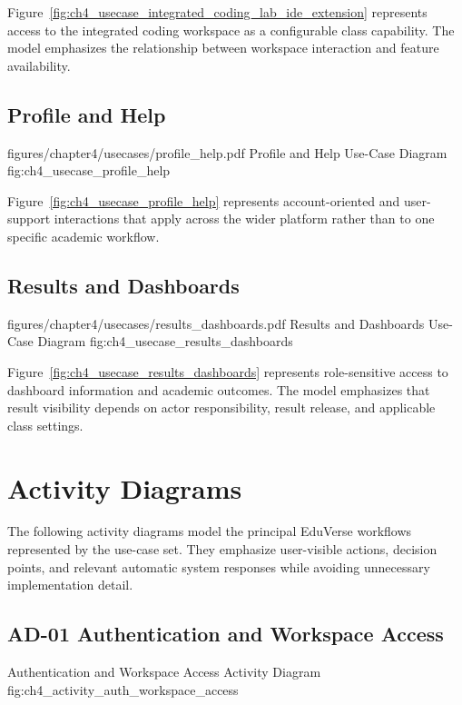 Figure~\ref{fig:ch4_usecase_integrated_coding_lab_ide_extension} represents
access to the integrated coding workspace as a configurable class capability.
The model emphasizes the relationship between workspace interaction and
feature availability.

\subsection*{Profile and Help}

\EduUseCasePdfFigure
  {figures/chapter4/usecases/profile_help.pdf}
  {Profile and Help Use-Case Diagram}
  {fig:ch4_usecase_profile_help}

Figure~\ref{fig:ch4_usecase_profile_help} represents account-oriented and
user-support interactions that apply across the wider platform rather than to
one specific academic workflow.

\subsection*{Results and Dashboards}

\EduUseCasePdfFigure
  {figures/chapter4/usecases/results_dashboards.pdf}
  {Results and Dashboards Use-Case Diagram}
  {fig:ch4_usecase_results_dashboards}

Figure~\ref{fig:ch4_usecase_results_dashboards} represents role-sensitive
access to dashboard information and academic outcomes. The model emphasizes
that result visibility depends on actor responsibility, result release, and
applicable class settings.

\clearpage

\section{Activity Diagrams}\label{sec:activity_diagrams}

The following activity diagrams model the principal EduVerse workflows
represented by the use-case set. They emphasize user-visible actions, decision
points, and relevant automatic system responses while avoiding unnecessary
implementation detail.

\subsection*{AD-01 Authentication and Workspace Access}

\EduActivityFigureReadable{\EduActivityAuthWorkspaceAccessDiagram}
  {Authentication and Workspace Access Activity Diagram}
  {fig:ch4_activity_auth_workspace_access}

